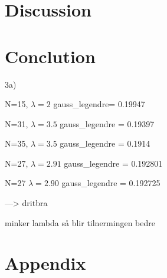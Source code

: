 \documentclass{article}
\begin{document}
\section*{Discussion}


\section*{Conclution}

3a)

N=15, $\lambda = 2$ gauss_legendre= 0.19947

N=31, $\lambda = 3.5$ gauss_legendre = 0.19397

N=35, $\lambda = 3.5$ gauss_legendre = 0.1914

N=27, $\lambda = 2.91$ gauss_legendre = 0.192801

N=27 $\lambda = 2.90$ gauss_legendre = 0.192725

---> dritbra

minker lambda så blir tilnermingen bedre


\section*{Appendix}
\end{document}
